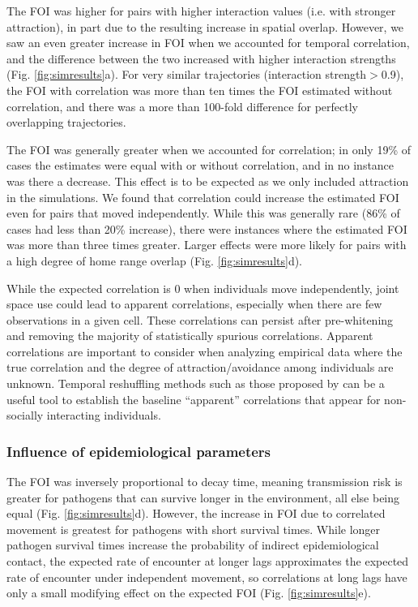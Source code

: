 \documentclass[letterpaper]{article}
\begin{document}
The FOI was higher for pairs with higher interaction values (i.e. with stronger attraction), in part due to the resulting increase in spatial overlap. 
However, we saw an even greater increase in FOI when we accounted for temporal correlation, and the difference between the two increased with higher interaction strengths (Fig. \ref{fig:simresults}a). For very similar trajectories (interaction strength$>$0.9), the FOI with correlation was more than ten times the FOI estimated without correlation, and there was a more than 100-fold difference for perfectly overlapping trajectories.  


The FOI was generally greater when we accounted for correlation; in only 19\% of cases the estimates were equal with or without correlation, and in no instance was there a decrease. This effect is to be expected as we only included attraction in the simulations. 
We found that correlation could increase the estimated FOI even for pairs that moved independently. While this was generally rare (86\% of cases had less than 20\% increase),
there were  instances where the estimated FOI was more than three times greater. Larger effects were more likely for pairs with a high degree of home range overlap (Fig. \ref{fig:simresults}d). 

While the expected correlation is 0 when individuals move independently, joint space use could lead to apparent correlations, especially when there are few observations in a given cell. These correlations can persist after pre-whitening and removing the majority of statistically spurious correlations. Apparent correlations are important to consider when analyzing empirical data where the true correlation and the degree of attraction/avoidance among individuals are unknown. Temporal reshuffling methods such as those proposed by \citet{Spiegel2016} can be a useful tool to establish the baseline ``apparent'' correlations that appear for non-socially interacting individuals.

\subsubsection*{Influence of epidemiological parameters}

The FOI was inversely proportional to decay time, meaning transmission risk is greater for pathogens that can survive longer in the environment, all else being equal (Fig. \ref{fig:simresults}d).
However, the increase in FOI due to correlated movement is greatest for pathogens with short survival times. While longer pathogen survival times increase the probability of indirect epidemiological contact, the expected rate of encounter at longer lags approximates the expected rate of encounter under independent movement, so correlations at long lags have only a small modifying effect on the expected FOI (Fig. \ref{fig:simresults}e). 
\end{document}
